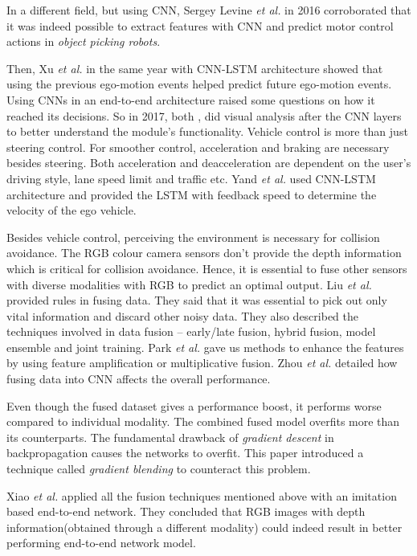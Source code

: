 In a different field, but using CNN, Sergey Levine \textit{et al.}
\cite{GooglePaperonCNNActuation} in 2016 corroborated that it was indeed possible to extract
features with CNN and predict motor control actions in \textit{object picking robots}.

Then, Xu \textit{et al.} \cite{XuGYD16CNNLSTM} in the same year with CNN-LSTM architecture
showed that using the previous ego-motion events helped predict future ego-motion events.
Using CNNs in an end-to-end architecture raised some questions on how it reached its
decisions. So in 2017, both \cite{heatmapsLearning}, \cite{BojarskiCNN1} did visual
analysis after the CNN layers to better understand the module's functionality.
Vehicle control is more than just steering control. For smoother control, acceleration and
braking are necessary besides steering. Both acceleration and deacceleration are dependent on  the user's driving
style, lane speed limit and traffic etc. Yand \textit{et
al.} \cite{E2EMultimodalDiscreteSpeed} used CNN-LSTM architecture and provided the LSTM
with feedback speed to determine the velocity of the ego vehicle.

Besides vehicle control, perceiving the environment is necessary for collision avoidance.
The RGB colour camera sensors don't provide the depth information which is critical for collision avoidance.
Hence, it is essential to fuse other sensors with diverse modalities with RGB to predict an optimal output.
Liu \textit{et al.} \cite{liu2018learn} provided rules in fusing data. They said that it was
essential to pick out only vital information and discard other noisy data.
They also described the techniques involved in data fusion -- early/late
fusion, hybrid fusion, model ensemble and joint training. Park \textit{et
al.} \cite{ParkHBB16} gave us methods to enhance the features by using feature amplification
or multiplicative fusion. Zhou \textit{et al.} \cite{ZhouSideChannel} detailed how fusing
data into CNN affects the overall performance.

Even though the fused dataset gives a performance boost, it performs worse
compared to individual modality. The combined fused model overfits more
than its counterparts. The fundamental drawback of
\textit{gradient descent} in backpropagation causes the networks to overfit. This paper \cite{wang2020makes} introduced a technique
called \textit{gradient blending} to counteract this problem.

Xiao \textit{et al.}\cite{XiaoCodevillaMultimodalE2E} applied all the fusion techniques
mentioned above with an imitation based end-to-end network\cite{codevilla2017endtoend}.
They concluded that RGB images with depth information(obtained through a different modality)
could indeed result in better performing end-to-end network model.

